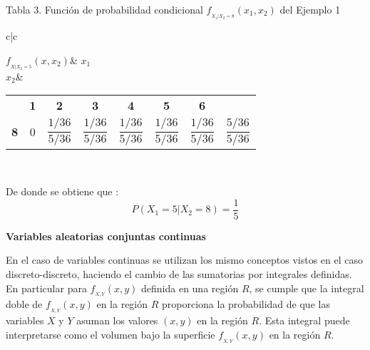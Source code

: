 \documentclass[base=hide,12pt]{elegantbook}
\begin{document}
\begin{center}
Tabla 3. Función de probabilidad condicional $f_{_{X_{1}|X_{2}=8}}(x_{1},x_{2})$ del Ejemplo 1  \\
\begin{tabular}{c|c}
	
	$f_{_{X|X_{2}=5}}(x,x_{2})$& \textcolor{col5}{\bf $x_{1}$} \\	
	\hline 
	\textcolor{col4}{\bf $x_{2}$}&	
\begin{tabular}{ccccccc|c}
& \textcolor{col5}{\bf 1} & \textcolor{col5}{\bf 2} & \textcolor{col5}{\bf 3} & \textcolor{col5}{\bf 4} & \textcolor{col5}{\bf 5} & \textcolor{col5}{\bf 6} &  \textcolor{col4}{\bf}   \\
\textcolor{col4}{\bf 8} &    0& $\dfrac{1/36}{5/36}$&    $\dfrac{1/36}{5/36}$&   $\dfrac{1/36}{5/36}$&    
\textcolor{col2}{\bf $\dfrac{1/36}{5/36}$}
&   $\dfrac{1/36}{5/36}$& \textcolor{col4}{\bf $\dfrac{5/36}{5/36}$}\\
\end{tabular}	

\\ 
\hline 
\end{tabular}	
\end{center}		

De donde se obtiene que :
$$P(X_{1}=5|X_{2}=8) = \dfrac{1}{5}$$

%


\vspace{1cm}
\textcolor{col4}{\bf \Large Variables aleatorias conjuntas continuas}\\
\vspace{.5cm}

En el caso de variables continuas se utilizan los mismo conceptos vistos en el caso discreto-discreto, haciendo el cambio de las sumatorias por integrales definidas. \\

En particular para $f_{_{X,Y}}(x,y)$ definida en una región $R$, se cumple que la integral doble de $f_{_{X,Y}}(x,y)$ en la región $R$ proporciona la probabilidad de que las variables $X$ y $Y$ asuman los valores $(x,y)$ en la región $R$. Esta integral puede interpretarse como el volumen bajo la superficie $f_{_{X,Y}}(x,y)$ en la región $R$.\\
\end{document}
